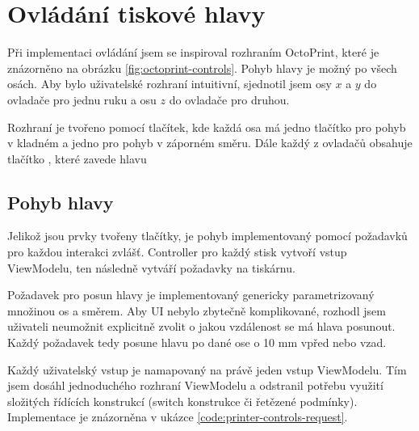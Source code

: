 \section{Ovládání tiskové hlavy}

Při implementaci ovládání jsem se inspiroval rozhraním OctoPrint, které je znázorněno na obrázku \ref{fig:octoprint-controls}.
Pohyb hlavy je možný po všech osách.
Aby bylo uživatelské rozhraní intuitivní, sjednotil jsem osy $x$ a $y$ do ovladače pro jednu ruku a osu $z$ do ovladače pro druhou.


Rozhraní je tvořeno pomocí tlačítek, kde každá osa má jedno tlačítko pro pohyb v kladném a jedno pro pohyb v záporném směru.
Dále každý z ovladačů obsahuje tlačítko , které zavede hlavu 

\subsection{Pohyb hlavy}

Jelikož jsou prvky tvořeny tlačítky, je pohyb implementovaný pomocí požadavků pro každou interakci zvlášť.
Controller pro každý stisk vytvoří vstup ViewModelu, ten následně vytváří požadavky na tiskárnu.

Požadavek pro posun hlavy je implementovaný genericky parametrizovaný množinou os a směrem.
Aby UI nebylo zbytečně komplikované, rozhodl jsem uživateli neumožnit explicitně zvolit o jakou vzdálenost se má hlava posunout.
Každý požadavek tedy posune hlavu po dané ose o 10 mm vpřed nebo vzad.

Každý uživatelský vstup je namapovaný na právě jeden vstup ViewModelu.
Tím jsem dosáhl jednoduchého rozhraní ViewModelu a odstranil potřebu využití složitých řídících konstrukcí (switch konstrukce či řetězené podmínky).
Implementace je znázorněna v ukázce \ref{code:printer-controls-request}.


